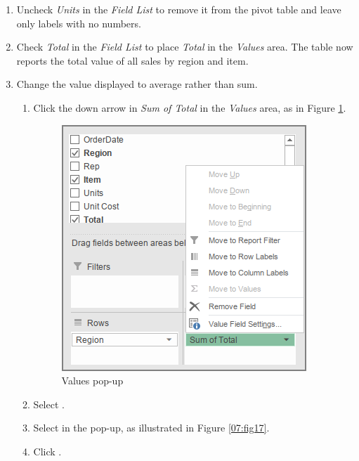 \begin{enumbox}
\begin{enumerate}
		\item Uncheck \textit{Units} in the \textit{Field List} to remove it from the pivot table and leave only labels with no numbers.
		\item Check \textit{Total} in the \textit{Field List} to place \textit{Total} in the \textit{Values} area. The table now reports the total value of all sales by region and item.
		\item Change the value displayed to average rather than sum.
	
		\begin{enumerate}
			\item Click the down arrow in \textit{Sum of Total} in the \textit{Values} area, as in Figure \ref{07:fig16}.
	
			\begin{figure}[H]
				\centering
				\includegraphics[width=\maxwidth{.75\linewidth}]{gfx/ch07_fig16}
				\caption{Values pop-up}
				\label{07:fig16}
			\end{figure}
	
			\item Select .
			\item Select  in the pop-up, as illustrated in Figure \ref{07:fig17}.
			\item Click .
		\end{enumerate}
	

\end{enumerate}
\end{enumbox}
